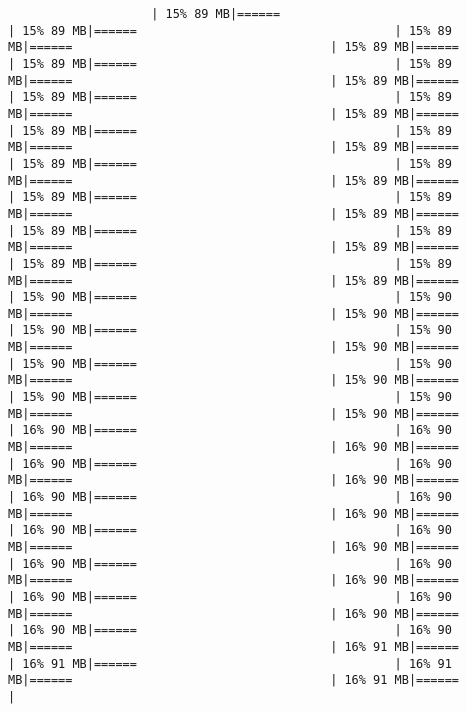 \documentclass[
]{article}
\begin{document}
\begin{verbatim}
                    | 15% 89 MB|======                                    | 15% 89 MB|======                                    | 15% 89 MB|======                                    | 15% 89 MB|======                                    | 15% 89 MB|======                                    | 15% 89 MB|======                                    | 15% 89 MB|======                                    | 15% 89 MB|======                                    | 15% 89 MB|======                                    | 15% 89 MB|======                                    | 15% 89 MB|======                                    | 15% 89 MB|======                                    | 15% 89 MB|======                                    | 15% 89 MB|======                                    | 15% 89 MB|======                                    | 15% 89 MB|======                                    | 15% 89 MB|======                                    | 15% 89 MB|======                                    | 15% 89 MB|======                                    | 15% 89 MB|======                                    | 15% 89 MB|======                                    | 15% 89 MB|======                                    | 15% 89 MB|======                                    | 15% 89 MB|======                                    | 15% 89 MB|======                                    | 15% 90 MB|======                                    | 15% 90 MB|======                                    | 15% 90 MB|======                                    | 15% 90 MB|======                                    | 15% 90 MB|======                                    | 15% 90 MB|======                                    | 15% 90 MB|======                                    | 15% 90 MB|======                                    | 15% 90 MB|======                                    | 15% 90 MB|======                                    | 15% 90 MB|======                                    | 15% 90 MB|======                                    | 16% 90 MB|======                                    | 16% 90 MB|======                                    | 16% 90 MB|======                                    | 16% 90 MB|======                                    | 16% 90 MB|======                                    | 16% 90 MB|======                                    | 16% 90 MB|======                                    | 16% 90 MB|======                                    | 16% 90 MB|======                                    | 16% 90 MB|======                                    | 16% 90 MB|======                                    | 16% 90 MB|======                                    | 16% 90 MB|======                                    | 16% 90 MB|======                                    | 16% 90 MB|======                                    | 16% 90 MB|======                                    | 16% 90 MB|======                                    | 16% 90 MB|======                                    | 16% 90 MB|======                                    | 16% 90 MB|======                                    | 16% 91 MB|======                                    | 16% 91 MB|======                                    | 16% 91 MB|======                                    | 16% 91 MB|======                                    | 
\end{verbatim}
\end{document}

